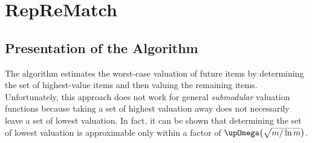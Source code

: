 \section{RepReMatch}
\label{sec:reprematch}

\subsection{Presentation of the Algorithm}
\label{subsec:reprematch:presentation}

The algorithm \SMatch{} estimates the worst-case valuation of future items by determining the set of highest-value items and then valuing the remaining items.
Unfortunately, this approach does not work for general \emph{submodular} valuation functions because taking a set of highest valuation away does not necessarily leave a set of lowest valuation.
In fact, it can be shown \cite{submodular_low_value} that determining the set of lowest valuation is approximable only within a factor of \(\smash[t]{\bigomega\paren[\big]{ \sqrt{m / \ln m} }}\).

